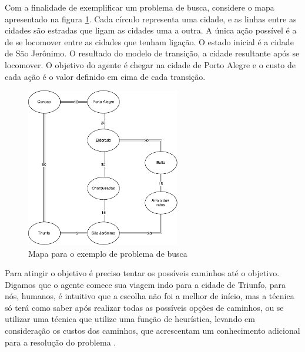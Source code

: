 
Com a finalidade de exemplificar um problema de busca, considere o mapa apresentado na figura \ref{fig:mapabusca}. Cada círculo representa uma cidade, e as linhas entre as cidades são estradas que ligam as cidades uma a outra. A única ação possível é a de se locomover entre as cidades que tenham ligação. O estado inicial é a cidade de São Jerônimo. O resultado do modelo de transição, a cidade resultante após se locomover. O objetivo do agente é chegar na cidade de Porto Alegre e o custo de cada ação é o valor definido em cima de cada transição. 

\begin{figure}[ht]
	\centering
	\includegraphics[width=0.6\textwidth]{fig/mapabusca.pdf}
	\caption{Mapa para o exemplo de problema de busca}
	\label{fig:mapabusca}
\end{figure} 

Para atingir o objetivo é preciso tentar os possíveis caminhos até o objetivo. Digamos que o agente comece sua viagem indo para a cidade de Triunfo, para nós, humanos, é intuitivo que a escolha não foi a melhor de início, mas a técnica só terá como saber após realizar todas as possíveis opções de caminhos, ou se utilizar uma técnica que utilize uma função de heurística, levando em consideração os custos dos caminhos, que acrescentam um conhecimento adicional para a resolução do problema \cite{intelligence2003modern}.


